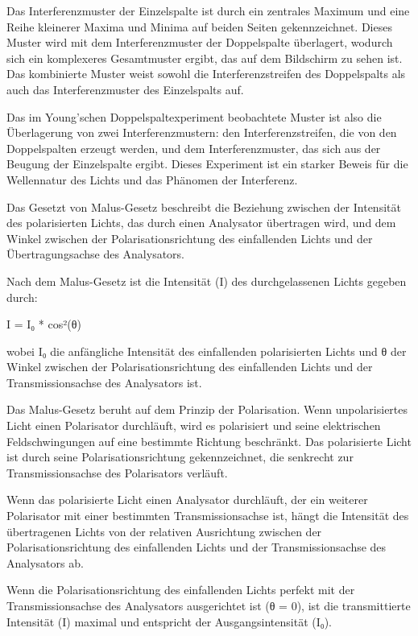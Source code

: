 \documentclass[12pt,english,ngerman]{scrartcl}
\begin{document}
Das Interferenzmuster der Einzelspalte ist durch ein zentrales Maximum und eine
Reihe kleinerer Maxima und Minima auf beiden Seiten gekennzeichnet. Dieses
Muster wird mit dem Interferenzmuster der Doppelspalte überlagert, wodurch sich
ein komplexeres Gesamtmuster ergibt, das auf dem Bildschirm zu sehen ist. Das
kombinierte Muster weist sowohl die Interferenzstreifen des Doppelspalts als
auch das Interferenzmuster des Einzelspalts auf.


Das im Young'schen Doppelspaltexperiment beobachtete Muster ist also die
Überlagerung von zwei Interferenzmustern: den Interferenzstreifen, die von den
Doppelspalten erzeugt werden, und dem Interferenzmuster, das sich aus der
Beugung der Einzelspalte ergibt. Dieses Experiment ist ein starker Beweis für
die Wellennatur des Lichts und das Phänomen der Interferenz.

Das Gesetzt von Malus-Gesetz beschreibt die Beziehung zwischen der Intensität
des polarisierten Lichts, das durch einen Analysator übertragen wird, und dem
Winkel zwischen der Polarisationsrichtung des einfallenden Lichts und der
Übertragungsachse des Analysators.

Nach dem Malus-Gesetz ist die Intensität (I) des durchgelassenen Lichts gegeben
durch:

I = I₀ * cos²(θ)

wobei I₀ die anfängliche Intensität des einfallenden polarisierten Lichts und θ
der Winkel zwischen der Polarisationsrichtung des einfallenden Lichts und der
Transmissionsachse des Analysators ist.

Das Malus-Gesetz beruht auf dem Prinzip der Polarisation. Wenn unpolarisiertes
Licht einen Polarisator durchläuft, wird es polarisiert und seine elektrischen
Feldschwingungen auf eine bestimmte Richtung beschränkt. Das polarisierte Licht
ist durch seine Polarisationsrichtung gekennzeichnet, die senkrecht zur
Transmissionsachse des Polarisators verläuft.

Wenn das polarisierte Licht einen Analysator durchläuft, der ein weiterer
Polarisator mit einer bestimmten Transmissionsachse ist, hängt die Intensität
des übertragenen Lichts von der relativen Ausrichtung zwischen der
Polarisationsrichtung des einfallenden Lichts und der Transmissionsachse des
Analysators ab.

Wenn die Polarisationsrichtung des einfallenden Lichts perfekt mit der
Transmissionsachse des Analysators ausgerichtet ist (θ = 0), ist die
transmittierte Intensität (I) maximal und entspricht der Ausgangsintensität
(I₀).
\end{document}
